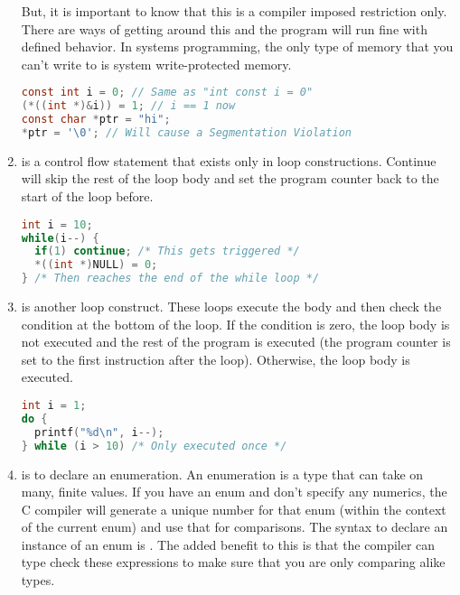 \begin{enumerate}
	      But, it is important to know that this is a compiler imposed restriction only.
        There are ways of getting around this and the program will run fine with defined behavior.
        In systems programming, the only type of memory that you can't write to is system write-protected memory.

	      \begin{lstlisting}[language=C]
const int i = 0; // Same as "int const i = 0"
(*((int *)&i)) = 1; // i == 1 now
const char *ptr = "hi";
*ptr = '\0'; // Will cause a Segmentation Violation
\end{lstlisting}

	    \item {} is a control flow statement that exists only in loop constructions.
        Continue will skip the rest of the loop body and set the program counter back to the start of the loop before.

	      \begin{lstlisting}[language=C]
int i = 10;
while(i--) {
  if(1) continue; /* This gets triggered */
  *((int *)NULL) = 0;
} /* Then reaches the end of the while loop */
\end{lstlisting}

	    \item {} is another loop construct.
        These loops execute the body and then check the condition at the bottom of the loop.
        If the condition is zero, the loop body is not executed and the rest of the program is executed (the program counter is set to the first instruction after the loop).
        Otherwise, the loop body is executed.

	      \begin{lstlisting}[language=C]
int i = 1;
do {
  printf("%d\n", i--);
} while (i > 10) /* Only executed once */
\end{lstlisting}

	    \item {} is to declare an enumeration.
        An enumeration is a type that can take on many, finite values.
        If you have an enum and don't specify any numerics, the C compiler will generate a unique number for that enum (within the context of the current enum) and use that for comparisons.
        The syntax to declare an instance of an enum is .
        The added benefit to this is that the compiler can type check these expressions to make sure that you are only comparing alike types.


\end{enumerate}
